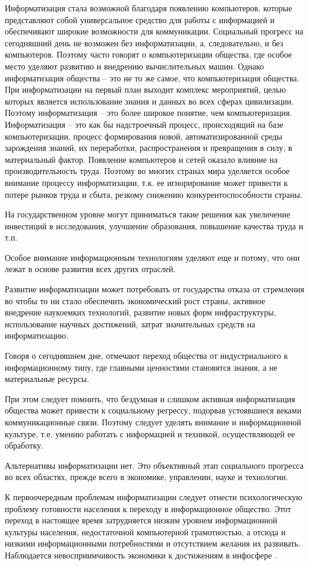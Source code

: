 Информатизация стала возможной благодаря появлению компьютеров, которые представляют собой универсальное средство для работы с информацией и обеспечивают широкие возможности для коммуникации. Социальный прогресс на сегодняшний день не возможен без информатизации, а, следовательно, и без компьютеров. Поэтому часто говорят о компьютеризации общества, где особое место уделяют развитию и внедрению вычислительных машин. Однако информатизация общества – это не то же самое, что компьютеризация общества. При информатизации на первый план выходит комплекс мероприятий, целью которых является использование знания и данных во всех сферах цивилизации. Поэтому информатизация – это более широкое понятие, чем компьютеризация. Информатизация – это как бы надстроечный процесс, происходящий на базе компьютеризации, процесс формирования новой, автоматизированной среды зарождения знаний, их переработки, распространения и превращения в силу, в материальный фактор.
Появление компьютеров и сетей оказало влияние на производительность труда. Поэтому во многих странах мира уделяется особое внимание процессу информатизации, т.к. ее игнорирование может привести к потере рынков труда и сбыта, резкому снижению конкурентоспособности страны.

На государственном уровне могут приниматься такие решения как увеличение инвестиций в исследования, улучшение образования, повышение качества труда и т.п.

Особое внимание информационным технологиям уделяют еще и потому, что они лежат в основе развития всех других отраслей.

Развитие информатизации может потребовать от государства отказа от стремления во чтобы то ни стало обеспечить экономический рост страны, активное внедрение наукоемких технологий, развитие новых форм инфраструктуры, использование научных достижений, затрат значительных средств на информатизацию.

Говоря о сегодняшнем дне, отмечают переход общества от индустриального к информационному типу, где главными ценностями становятся знания, а не материальные ресурсы.

При этом следует помнить, что бездумная и слишком активная информатизация общества может привести к социальному регрессу, подорвав устоявшиеся веками коммуникационные связи. Поэтому следует уделять внимание и информационной культуре, т.е. умению работать с информацией и техникой, осуществляющей ее обработку.

Альтернативы информатизации нет. Это объективный этап социального прогресса во всех областях, прежде всего в экономике, управлении, науке и технологии.

К первоочередным проблемам информатизации следует отнести психологическую проблему готовности населения к переходу в информационное общество. Этот переход в настоящее время затрудняется низким уровнем информационной культуры населения, недостаточной компьютерной грамотностью, а отсюда и низкими информационными потребностями и отсутствием желания их развивать. Наблюдается невосприимчивость экономики к достижениям в инфосфере \cite{bib215}.




\clearpage